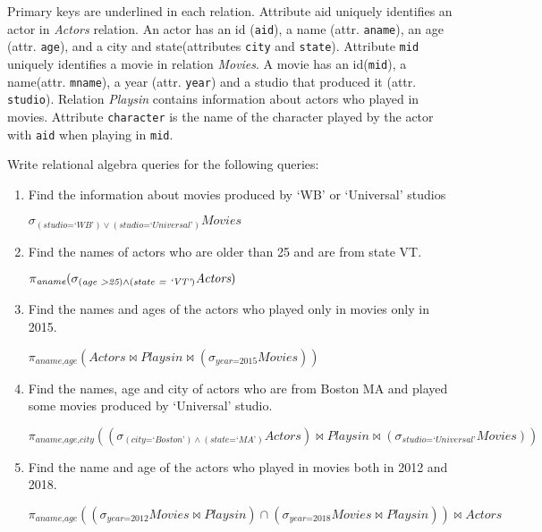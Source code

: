 \documentclass[letterpaper, 11pt]{article}
\begin{document}
Primary keys are underlined in each relation. Attribute aid uniquely identifies an actor in \textit{Actors} relation. An actor has an id (\texttt{aid}), a name (attr. \texttt{aname}), an age (attr. \texttt{age}), and a city and state(attributes \texttt{city} and \texttt{state}). Attribute \texttt{mid} uniquely identifies a movie in relation \textit{Movies}. A movie has an id(\texttt{mid}), a name(attr. \texttt{mname}), a year (attr. \texttt{year}) and a studio that produced it (attr. \texttt{studio}). Relation \textit{Playsin} contains information about actors who played in movies. Attribute \texttt{character} is the name of the character played by the actor with \texttt{aid} when playing in \texttt{mid}.

Write relational algebra queries for the following queries:
\begin{enumerate}[label={\alph*})]
    \item Find the information about movies produced by `WB' or `Universal' studios
    
    $\sigma_{(\textit{studio=`WB'}) \vee (\textit{studio=`Universal'})}\textit{Movies}$
    
    \item Find the names of actors who are older than 25 and are from state VT.

    $\pi_{\textit{aname}}(\sigma_{(\textit{age \textgreater 25}) \wedge (\textit{state = `VT'})}\textit{Actors})$
    
    \item Find the names and ages of the actors who played only in movies only in 2015.

    $\pi_{\textit{aname,age}}(\textit{Actors} \bowtie \textit{Playsin} \bowtie (\sigma_{\textit{year=2015}}\textit{Movies}))$
    
    \item Find the names, age and city of actors who are from Boston MA and played some movies produced by `Universal' studio.

    $\pi_{\textit{aname,age,city}}((\sigma_{(\textit{city=`Boston'})\wedge (\textit{state=`MA'})}\textit{Actors}) \bowtie \textit{Playsin} \bowtie (\sigma_{\textit{studio=`Universal'}}\textit{Movies}))$
    
    \item Find the name and age of the actors who played in movies both in 2012 and 2018.

    $\pi_{\textit{aname,age}}((\sigma_{\textit{year=2012}}\textit{Movies} \bowtie \textit{Playsin}) \cap (\sigma_{\textit{year=2018}}\textit{Movies} \bowtie \textit{Playsin})) \bowtie \textit{Actors}$
    

\end{enumerate}
\end{document}
